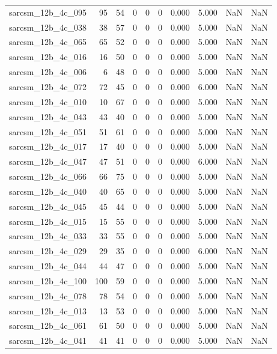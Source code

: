 \documentclass{article}
\begin{document}
\begin{longtable}{lrrrrrrrrr}
sarcsm\_12b\_4c\_095 & 95 & 54 & 0 & 0 & 0 & 0.000 & 5.000 & NaN & NaN \\
sarcsm\_12b\_4c\_038 & 38 & 57 & 0 & 0 & 0 & 0.000 & 5.000 & NaN & NaN \\
sarcsm\_12b\_4c\_065 & 65 & 52 & 0 & 0 & 0 & 0.000 & 5.000 & NaN & NaN \\
sarcsm\_12b\_4c\_016 & 16 & 50 & 0 & 0 & 0 & 0.000 & 5.000 & NaN & NaN \\
sarcsm\_12b\_4c\_006 & 6 & 48 & 0 & 0 & 0 & 0.000 & 5.000 & NaN & NaN \\
sarcsm\_12b\_4c\_072 & 72 & 45 & 0 & 0 & 0 & 0.000 & 6.000 & NaN & NaN \\
sarcsm\_12b\_4c\_010 & 10 & 67 & 0 & 0 & 0 & 0.000 & 5.000 & NaN & NaN \\
sarcsm\_12b\_4c\_043 & 43 & 40 & 0 & 0 & 0 & 0.000 & 5.000 & NaN & NaN \\
sarcsm\_12b\_4c\_051 & 51 & 61 & 0 & 0 & 0 & 0.000 & 5.000 & NaN & NaN \\
sarcsm\_12b\_4c\_017 & 17 & 40 & 0 & 0 & 0 & 0.000 & 5.000 & NaN & NaN \\
sarcsm\_12b\_4c\_047 & 47 & 51 & 0 & 0 & 0 & 0.000 & 6.000 & NaN & NaN \\
sarcsm\_12b\_4c\_066 & 66 & 75 & 0 & 0 & 0 & 0.000 & 5.000 & NaN & NaN \\
sarcsm\_12b\_4c\_040 & 40 & 65 & 0 & 0 & 0 & 0.000 & 5.000 & NaN & NaN \\
sarcsm\_12b\_4c\_045 & 45 & 44 & 0 & 0 & 0 & 0.000 & 5.000 & NaN & NaN \\
sarcsm\_12b\_4c\_015 & 15 & 55 & 0 & 0 & 0 & 0.000 & 5.000 & NaN & NaN \\
sarcsm\_12b\_4c\_033 & 33 & 55 & 0 & 0 & 0 & 0.000 & 5.000 & NaN & NaN \\
sarcsm\_12b\_4c\_029 & 29 & 35 & 0 & 0 & 0 & 0.000 & 6.000 & NaN & NaN \\
sarcsm\_12b\_4c\_044 & 44 & 47 & 0 & 0 & 0 & 0.000 & 5.000 & NaN & NaN \\
sarcsm\_12b\_4c\_100 & 100 & 59 & 0 & 0 & 0 & 0.000 & 5.000 & NaN & NaN \\
sarcsm\_12b\_4c\_078 & 78 & 54 & 0 & 0 & 0 & 0.000 & 5.000 & NaN & NaN \\
sarcsm\_12b\_4c\_013 & 13 & 53 & 0 & 0 & 0 & 0.000 & 5.000 & NaN & NaN \\
sarcsm\_12b\_4c\_061 & 61 & 50 & 0 & 0 & 0 & 0.000 & 5.000 & NaN & NaN \\
sarcsm\_12b\_4c\_041 & 41 & 41 & 0 & 0 & 0 & 0.000 & 5.000 & NaN & NaN \\

\end{longtable}
\end{document}
